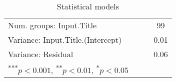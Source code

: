 \begin{table}
\begin{center}
\begin{tabular}{l c c c c }
Num. groups: Input.Title          &              &              &              & 99           \\
Variance: Input.Title.(Intercept) &              &              &              & 0.01         \\
Variance: Residual                &              &              &              & 0.06         \\
\bottomrule
\multicolumn{5}{l}{\scriptsize{\textsuperscript{***}$p<0.001$, 
  \textsuperscript{**}$p<0.01$, 
  \textsuperscript{*}$p<0.05$}}
\end{tabular}
\caption{Statistical models}
\label{table:coefficients}
\end{center}
\end{table}

